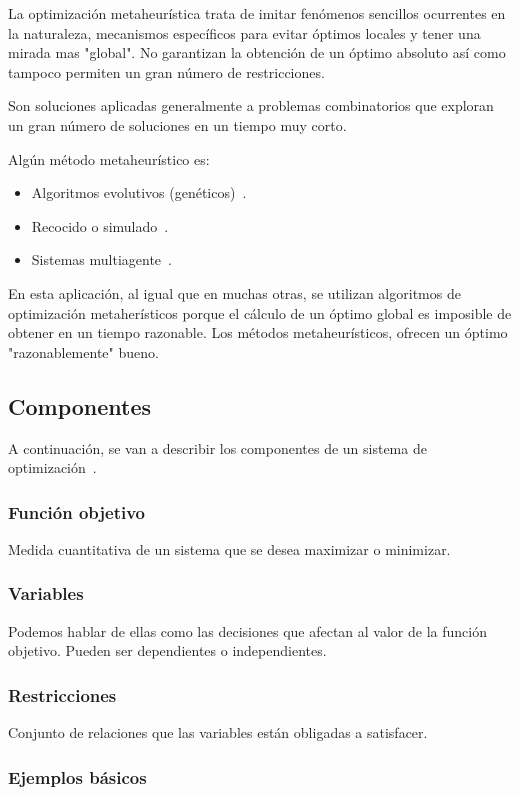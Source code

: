 La optimización metaheurística trata de imitar fenómenos sencillos ocurrentes en la naturaleza, mecanismos específicos para evitar óptimos locales y tener una mirada mas "global". No garantizan la obtención de un óptimo absoluto así como tampoco permiten un gran número de restricciones.

Son soluciones aplicadas generalmente a problemas combinatorios que exploran un gran número de soluciones en un tiempo muy corto.

Algún método metaheurístico es:
\begin{itemize}
	\item Algoritmos evolutivos (genéticos)~\cite{pdf:algoritmosGeneticos}.
	\item Recocido o simulado~\cite{web:recocidoSimulado}.
	\item Sistemas multiagente~\cite{web:sistemasMultiagente}.
\end{itemize}

En esta aplicación, al igual que en muchas otras, se utilizan algoritmos de optimización metaherísticos porque el cálculo de un óptimo global es imposible de obtener en un tiempo razonable. Los métodos metaheurísticos, ofrecen un óptimo "razonablemente" bueno.

\subsection{Componentes}
A continuación, se van a describir los componentes de un sistema de optimización~\cite{pdf:optimizacion}.

\subsubsection{Función objetivo}
Medida cuantitativa de un sistema que se desea maximizar o minimizar.

\subsubsection{Variables}
Podemos hablar de ellas como las decisiones que afectan al valor de la función objetivo. Pueden ser dependientes o independientes.

\subsubsection{Restricciones}
Conjunto de relaciones que las variables están obligadas a satisfacer.

\subsubsection{Ejemplos básicos}

